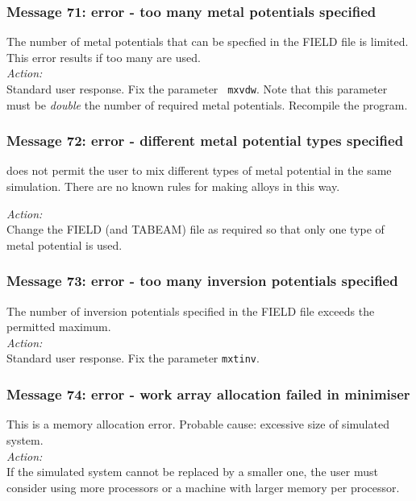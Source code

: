 \subsubsection*{Message 71: error - too many metal potentials specified}

The number of metal potentials  that can be specfied in the FIELD file
is limited. This error results if too many are used. \\

\noindent
{\em Action:} \\ Standard user response. Fix the parameter {\tt
mxvdw}.  Note that this parameter must be {\em double} the number of
required metal potentials. Recompile the
program.

\subsubsection*{Message 72: error - different metal potential types
specified}

\D{} does not permit the user to mix different types of metal potential
in the same simulation. There are no known rules for making alloys in
this way.

\noindent
{\em Action:}\\
Change the FIELD (and TABEAM) file as required so that only one type
of metal potential is used.

\subsubsection*{Message 73: error - too many inversion potentials specified}

The number of inversion potentials specified in the FIELD file exceeds
the permitted maximum.\\

\noindent
{\em Action:}\\
Standard user response. Fix the parameter {\tt mxtinv}.

\subsubsection*{Message 74: error - work array allocation failed in minimiser}

This is a memory allocation error. Probable cause: excessive size of
simulated system. \\

\noindent
{\em Action:}\\
If the simulated system cannot be replaced by a smaller one, the user
must consider using more processors or a machine with larger memory
per processor.

